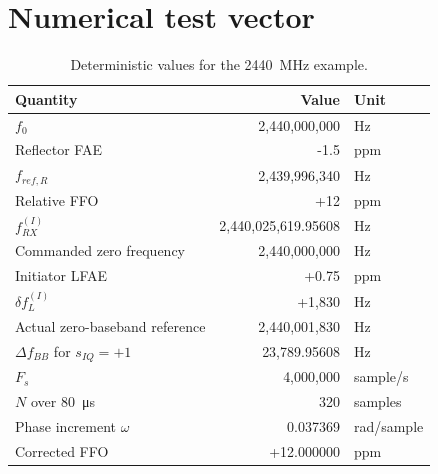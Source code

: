 \documentclass[10pt,a4paper]{article}
\begin{document}
\section{Numerical test vector}
\begin{table}[ht]
\centering
\caption{Deterministic values for the \SI{2440}{\mega\hertz} example.}
\begin{tabularx}{\linewidth}{@{}X r l@{}}
\toprule Quantity & Value & Unit\\\midrule
$f_0$ & 2,440,000,000 & Hz\\
Reflector FAE & -1.5 & ppm\\
$f_{ref,R}$ & 2,439,996,340 & Hz\\
Relative FFO & +12 & ppm\\
$f_{RX}^{(I)}$ & 2,440,025,619.95608 & Hz\\
Commanded zero frequency & 2,440,000,000 & Hz\\
Initiator LFAE & +0.75 & ppm\\
$\delta f_L^{(I)}$ & +1,830 & Hz\\
Actual zero-baseband reference & 2,440,001,830 & Hz\\
$\Delta f_{BB}$ for $s_{IQ}=+1$ & 23,789.95608 & Hz\\
$F_s$ & 4,000,000 & sample/s\\
$N$ over \SI{80}{\micro\second} & 320 & samples\\
Phase increment $\omega$ & 0.037369 & rad/sample\\
Corrected FFO & +12.000000 & ppm\\
\bottomrule
\end{tabularx}
\end{table}
\end{document}
